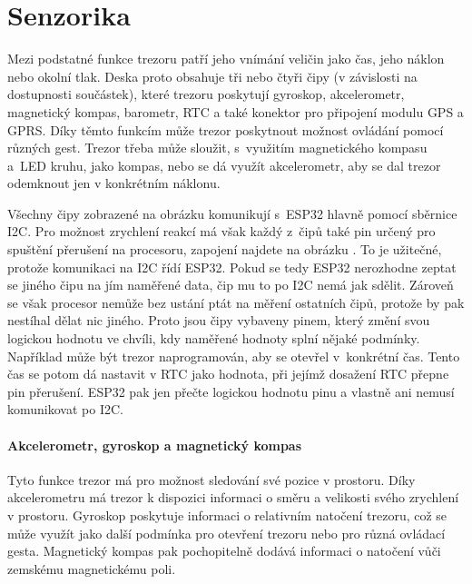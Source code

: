 \vspace{-3mm}
\section{Senzorika}
\vspace{-3mm}
Mezi podstatné funkce trezoru patří jeho vnímání veličin jako čas, jeho náklon nebo okolní tlak.
Deska proto obsahuje tři nebo čtyři čipy (v závislosti na dostupnosti součástek), které trezoru poskytují gyroskop, akcelerometr, magnetický kompas,
barometr, RTC a také konektor pro připojení modulu GPS a GPRS. Díky těmto funkcím může trezor poskytnout možnost ovládání 
pomocí různých gest. 
Trezor třeba může sloužit, s~využitím magnetického kompasu a~LED kruhu, jako kompas, nebo se dá využít akcelerometr, 
aby se dal trezor odemknout jen v konkrétním náklonu. 

Všechny čipy zobrazené na obrázku  komunikují s~ESP32 hlavně pomocí 
sběrnice I2C. Pro možnost zrychlení reakcí má však každý z~čipů také pin určený pro spuštění přerušení na procesoru, zapojení najdete na obrázku . 
To je užitečné, protože komunikaci na I2C řídí ESP32. Pokud se tedy ESP32 nerozhodne zeptat se jiného čipu na jím naměřené data, čip mu to po I2C nemá 
jak sdělit. Zároveň se však procesor nemůže bez ustání ptát na měření ostatních čipů, protože by pak nestíhal dělat nic jiného. Proto jsou čipy vybaveny 
pinem, který změní svou logickou hodnotu ve chvíli, kdy naměřené hodnoty splní nějaké podmínky. 
Například může být trezor naprogramován, aby se otevřel 
v~konkrétní čas. Tento čas se potom dá nastavit v RTC jako hodnota, při jejímž dosažení RTC přepne pin přerušení. ESP32 pak jen přečte logickou hodnotu 
pinu a vlastně ani nemusí komunikovat po I2C.

\paragraph{Akcelerometr, gyroskop a magnetický kompas}
Tyto funkce trezor má pro možnost sledování své pozice v prostoru. 
Díky akcelerometru má trezor k dispozici informaci o směru a velikosti svého zrychlení v prostoru.
Gyroskop poskytuje informaci o relativním natočení trezoru, což se může využít jako další podmínka pro otevření trezoru nebo pro různá ovládací gesta.
Magnetický kompas pak pochopitelně dodává informaci o natočení vůči zemskému magnetickému poli.

